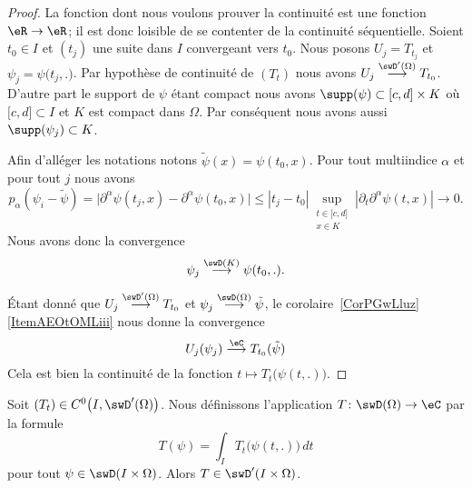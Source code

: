 \begin{proof}
	La fonction dont nous voulons prouver la continuité est une fonction \( \eR\to\eR\); il est donc loisible de se contenter de la continuité séquentielle. Soient \( t_0\in I\) et \( (t_j)\) une suite dans \( I\) convergeant vers \( t_0\). Nous posons \( U_j=T_{t_j}\) et \( \psi_j=\psi\big( t_j,. \big)\). Par hypothèse de continuité de \( (T_t)\) nous avons \( U_j\stackrel{\swD'(\Omega)}{\longrightarrow}T_{t_0}\). D'autre part le support de \( \psi\) étant compact nous avons \( \supp(\psi)\subset \mathopen[ c , d \mathclose]\times K\) où \( \mathopen[ c , d \mathclose]\subset I\) et \( K\) est compact dans \( \Omega\). Par conséquent nous avons aussi \( \supp(\psi_j)\subset K\).

	Afin d'alléger les notations notons \( \tilde \psi(x)=\psi(t_0,x)\). Pour tout multiindice \( \alpha\) et pour tout \( j\) nous avons
	\begin{equation}
		p_{\alpha}(\psi_i-\tilde \psi)=\Big|  \partial^{\alpha}\psi(t_j,x)-\partial^{\alpha}\psi(t_0,x)    \Big|\leq | t_j-t_0 |\sup_{\substack{t\in\mathopen[ c , d \mathclose]\\x\in K}}| \partial_t\partial^{\alpha}\psi(t,x) |\to 0.
	\end{equation}
	Nous avons donc la convergence
	\begin{equation}
		\psi_j\stackrel{\swD(K)}{\longrightarrow}\psi(t_0,.).
	\end{equation}

	Étant donné que \( U_j\stackrel{\swD'(\Omega)}{\longrightarrow}T_{t_0}\) et \( \psi_j\stackrel{\swD(\Omega)}{\longrightarrow}\tilde \psi\), le corolaire~\ref{CorPGwLluz}\ref{ItemAEOtOMLiii} nous donne la convergence
	\begin{equation}
		U_j(\psi_j)\stackrel{\eC}{\longrightarrow} T_{t_0}(\tilde \psi)
	\end{equation}
	Cela est bien la continuité de la fonction \( t\mapsto T_t\big( \psi(t,.) \big)\).
\end{proof}


\begin{proposition} \label{PropLKtBsVi}
	Soit \( (T_t)\in C^0\big( I,\swD'(\Omega) \big)\). Nous définissons l'application \( T\colon \swD(\Omega)\to \eC\) par la formule
	\begin{equation}
		T(\psi)=\int_I T_t\big( \psi(t,.) \big)\,dt
	\end{equation}
	pour tout \( \psi\in\swD(I\times \Omega)\). Alors \( T\in \swD'(I\times \Omega)\).
\end{proposition}

